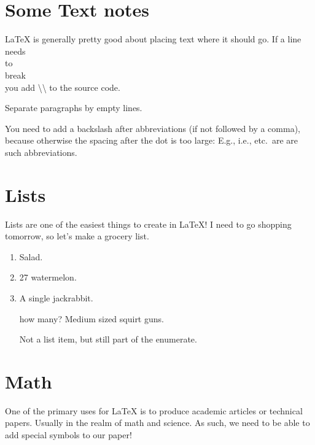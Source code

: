 \documentclass[12pt]{article}
\begin{document}
\section{Some Text notes}
\LaTeX{} is generally pretty good about placing text where it should
go. If
a line \\ needs \\ to \\ break \\ you add \textbackslash\textbackslash{}
to the source code.

Separate paragraphs by empty lines.

You need to add a backslash after abbreviations (if not followed by a comma), because otherwise the spacing after the dot is too large:
E.g., i.e., etc.\ are are such abbreviations.

\section{Lists}
Lists are one of the easiest things to create in \LaTeX! I need to go shopping
tomorrow, so let's make a grocery list.
\begin{enumerate} %
  \item Salad.
  \item 27 watermelon.
  \item A single jackrabbit.
  \item[how many?] Medium sized squirt guns.

  Not a list item, but still part of the enumerate.

\end{enumerate} %

\section{Math}

One of the primary uses for \LaTeX{} is to produce academic articles
or technical papers. Usually in the realm of math and science. As such,
we need to be able to add special symbols to our paper!
\end{document}
